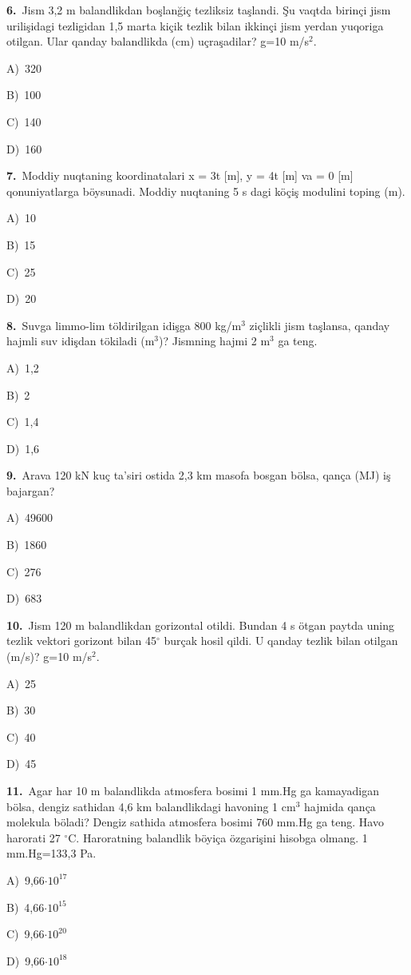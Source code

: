 \documentclass[11pt,a4paper]{article}
\newcommand{\opt}[2]{\hspace*{4mm}#1)\ #2\par}
\begin{document}
\noindent\begin{minipage}{\linewidth}
\textbf{6.}\ Jism 3,2 m balandlikdan boşlanğiç tezliksiz taşlandi. Şu vaqtda birinçi jism urilişidagi tezligidan 1,5 marta kiçik tezlik bilan ikkinçi jism yerdan yuqoriga otilgan. Ular qanday balandlikda (cm) uçraşadilar? g=10 m/s$^{2}$.\par\smallskip
\opt{A}{320}
\opt{B}{100}
\opt{C}{140}
\opt{D}{160}
\end{minipage}\vspace{9pt}\par
\noindent\begin{minipage}{\linewidth}
\textbf{7.}\ Moddiy nuqtaning koordinatalari x = 3t [m], y = 4t [m] va = 0 [m] qonuniyatlarga böysunadi. Moddiy nuqtaning 5 s dagi köçiş modulini toping (m).\par\smallskip
\opt{A}{10}
\opt{B}{15}
\opt{C}{25}
\opt{D}{20}
\end{minipage}\vspace{9pt}\par
\noindent\begin{minipage}{\linewidth}
\textbf{8.}\ Suvga limmo-lim töldirilgan idişga 800 kg/m$^{3}$ ziçlikli jism taşlansa, qanday hajmli suv idişdan tökiladi (m$^{3}$)? Jismning hajmi 2 m$^{3}$ ga teng.\par\smallskip
\opt{A}{1,2}
\opt{B}{2}
\opt{C}{1,4}
\opt{D}{1,6}
\end{minipage}\vspace{9pt}\par
\noindent\begin{minipage}{\linewidth}
\textbf{9.}\ Arava 120 kN kuç ta’siri ostida 2,3 km masofa bosgan bölsa, qança (MJ) iş bajargan?\par\smallskip
\opt{A}{49600}
\opt{B}{1860}
\opt{C}{276}
\opt{D}{683}
\end{minipage}\vspace{9pt}\par
\noindent\begin{minipage}{\linewidth}
\textbf{10.}\ Jism 120 m balandlikdan gorizontal otildi. Bundan 4 s ötgan paytda uning tezlik vektori gorizont bilan 45$^\circ$ burçak hosil qildi. U qanday tezlik bilan otilgan (m/s)? g=10 m/s$^{2}$.\par\smallskip
\opt{A}{25}
\opt{B}{30}
\opt{C}{40}
\opt{D}{45}
\end{minipage}\vspace{9pt}\par
\noindent\begin{minipage}{\linewidth}
\textbf{11.}\ Agar har 10 m balandlikda atmosfera bosimi 1 mm.Hg ga kamayadigan bölsa, dengiz sathidan 4,6 km balandlikdagi havoning 1 cm$^{3}$ hajmida qança molekula böladi? Dengiz sathida atmosfera bosimi 760 mm.Hg ga teng. Havo harorati 27 $^\circ$C. Haroratning balandlik böyiça özgarişini hisobga olmang. 1 mm.Hg=133,3 Pa.\par\smallskip
\opt{A}{9,66$\cdot10^{17}$}
\opt{B}{4,66$\cdot10^{15}$}
\opt{C}{9,66$\cdot10^{20}$}
\opt{D}{9,66$\cdot10^{18}$}
\end{minipage}\vspace{9pt}\par
\end{document}

